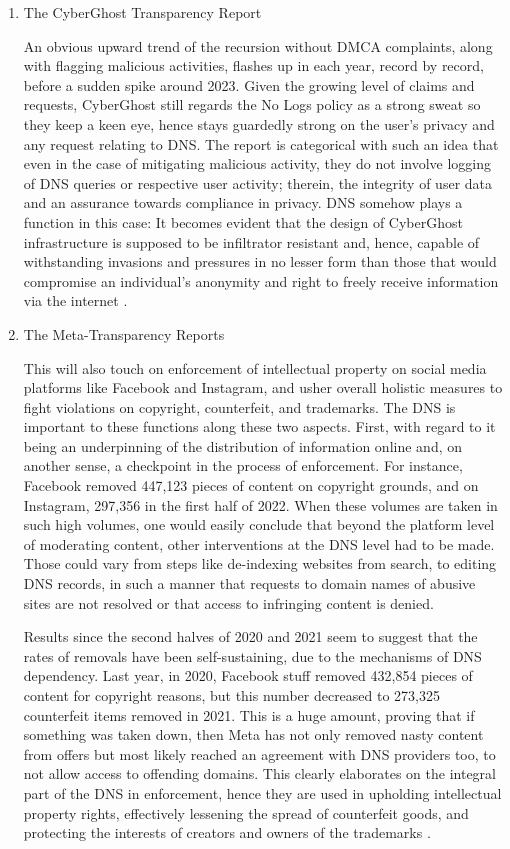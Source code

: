\begin{enumerate}
\item The CyberGhost Transparency Report

An obvious upward trend of the recursion without DMCA complaints, along with flagging malicious activities, flashes up in each year, record by record, before a sudden spike around 2023. Given the growing level of claims and requests, CyberGhost still regards the No Logs policy as a strong sweat so they keep a keen eye, hence stays guardedly strong on the user's privacy and any request relating to DNS. The report is categorical with such an idea that even in the case of mitigating malicious activity, they do not involve logging of DNS queries or respective user activity; therein, the integrity of user data and an assurance towards compliance in privacy. DNS somehow plays a function in this case: It becomes evident that the design of CyberGhost infrastructure is supposed to be infiltrator resistant and, hence, capable of withstanding invasions and pressures in no lesser form than those that would compromise an individual's anonymity and right to freely receive information via the internet \cite{CyberGhostVPN2023}.

\item The Meta-Transparency Reports

This will also touch on enforcement of intellectual property on social media platforms like Facebook and Instagram, and usher overall holistic measures to fight violations on copyright, counterfeit, and trademarks. The DNS is important to these functions along these two aspects. First, with regard to it being an underpinning of the distribution of information online and, on another sense, a checkpoint in the process of enforcement. For instance, Facebook removed 447,123 pieces of content on copyright grounds, and on Instagram, 297,356 in the first half of 2022. When these volumes are taken in such high volumes, one would easily conclude that beyond the platform level of moderating content, other interventions at the DNS level had to be made. Those could vary from steps like de-indexing websites from search, to editing DNS records, in such a manner that requests to domain names of abusive sites are not resolved or that access to infringing content is denied.

Results since the second halves of 2020 and 2021 seem to suggest that the rates of removals have been self-sustaining, due to the mechanisms of DNS dependency. Last year, in 2020, Facebook stuff removed 432,854 pieces of content for copyright reasons, but this number decreased to 273,325 counterfeit items removed in 2021. This is a huge amount, proving that if something was taken down, then Meta has not only removed nasty content from offers but most likely reached an agreement with DNS providers too, to not allow access to offending domains. This clearly elaborates on the integral part of the DNS in enforcement, hence they are used in upholding intellectual property rights, effectively lessening the spread of counterfeit goods, and protecting the interests of creators and owners of the trademarks \cite{Facebook2023}.


\end{enumerate}

